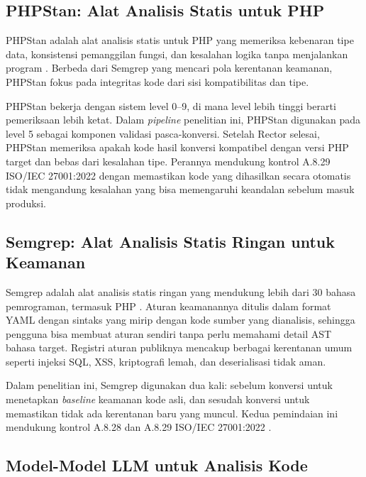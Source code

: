     \subsection{PHPStan: Alat Analisis Statis untuk PHP}

    PHPStan adalah alat analisis statis untuk PHP yang memeriksa kebenaran tipe data, konsistensi pemanggilan fungsi, dan kesalahan logika tanpa menjalankan program \cite{phpstan2024}. Berbeda dari Semgrep yang mencari pola kerentanan keamanan, PHPStan fokus pada integritas kode dari sisi kompatibilitas dan tipe.

    PHPStan bekerja dengan sistem level 0--9, di mana level lebih tinggi berarti pemeriksaan lebih ketat. Dalam \textit{pipeline} penelitian ini, PHPStan digunakan pada level 5 sebagai komponen validasi pasca-konversi. Setelah Rector selesai, PHPStan memeriksa apakah kode hasil konversi kompatibel dengan versi PHP target dan bebas dari kesalahan tipe. Perannya mendukung kontrol A.8.29 ISO/IEC 27001:2022 \cite{iso27001_2022} dengan memastikan kode yang dihasilkan secara otomatis tidak mengandung kesalahan yang bisa memengaruhi keandalan sebelum masuk produksi.

    \subsection{Semgrep: Alat Analisis Statis Ringan untuk Keamanan}

    Semgrep adalah alat analisis statis ringan yang mendukung lebih dari 30 bahasa pemrograman, termasuk PHP \cite{semgrep2024}. Aturan keamanannya ditulis dalam format YAML dengan sintaks yang mirip dengan kode sumber yang dianalisis, sehingga pengguna bisa membuat aturan sendiri tanpa perlu memahami detail AST bahasa target. Registri aturan publiknya mencakup berbagai kerentanan umum seperti injeksi SQL, XSS, kriptografi lemah, dan deserialisasi tidak aman.

    Dalam penelitian ini, Semgrep digunakan dua kali: sebelum konversi untuk menetapkan \textit{baseline} keamanan kode asli, dan sesudah konversi untuk memastikan tidak ada kerentanan baru yang muncul. Kedua pemindaian ini mendukung kontrol A.8.28 dan A.8.29 ISO/IEC 27001:2022 \cite{iso27001_2022}.

    \subsection{Model-Model LLM untuk Analisis Kode}
    \label{subsec:model-llm}

